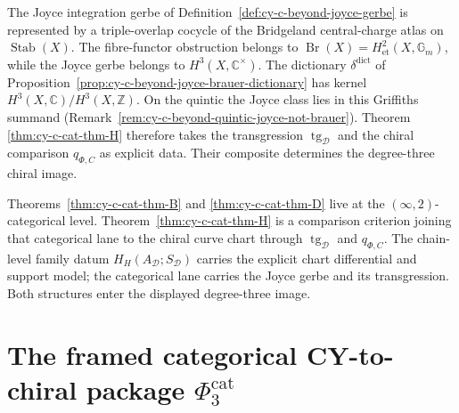\begin{remark}
\label{rem:cy-c-cat-thm-H-gerbe-crosslink}
The Joyce integration gerbe of
Definition~\ref{def:cy-c-beyond-joyce-gerbe} is represented by a
triple-overlap cocycle of the Bridgeland central-charge atlas on
$\operatorname{Stab}(X)$.  The fibre-functor obstruction belongs to
$\operatorname{Br}(X)=H^2_{\mathrm{et}}(X,\mathbb G_m)$, while the
Joyce gerbe belongs to $H^3(X,\mathbb C^\times)$.  The dictionary
$\delta^{\mathrm{dict}}$ of
Proposition~\ref{prop:cy-c-beyond-joyce-brauer-dictionary} has kernel
$H^3(X,\mathbb C)/H^3(X,\mathbb Z)$.  On the quintic the Joyce class
lies in this Griffiths summand
(Remark~\ref{rem:cy-c-beyond-quintic-joyce-not-brauer}).  Theorem~
\ref{thm:cy-c-cat-thm-H} therefore takes the transgression
$\operatorname{tg}_\mathcal D$ and the chiral comparison
$q_{\Phi,C}$ as explicit data.  Their composite determines the
degree-three chiral image.
\end{remark}

\begin{remark}
\label{rem:cy-c-cat-thm-BDH-lanes}
Theorems~\ref{thm:cy-c-cat-thm-B} and
\ref{thm:cy-c-cat-thm-D} live at the $(\infty,2)$-categorical level.
Theorem~\ref{thm:cy-c-cat-thm-H} is a comparison criterion joining
that categorical lane to the chiral curve chart through
$\operatorname{tg}_\mathcal D$ and $q_{\Phi,C}$.  The chain-level
family datum $H_H(A_\mathcal D;S_\mathcal D)$ carries the explicit
chart differential and support model; the categorical lane carries
the Joyce gerbe and its transgression.  Both structures enter the
displayed degree-three image.
\end{remark}

\section{The framed categorical CY-to-chiral package \texorpdfstring{$\Phi_3^{\mathrm{cat}}$}{Phi-3-()cat}}
\label{sec:cy-c-beyond-cat-master-synthesis}

